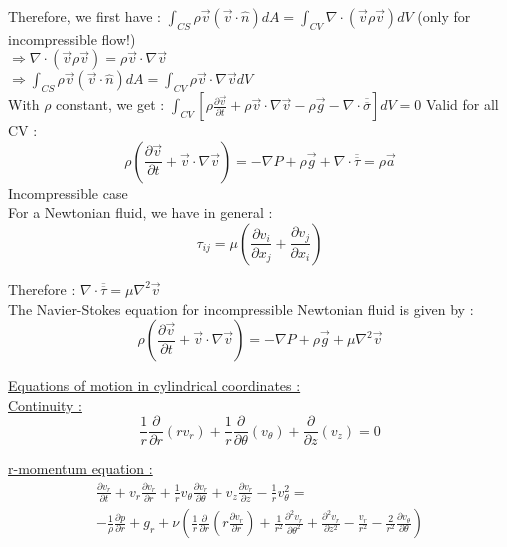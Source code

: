 \documentclass[../main.tex]{subfiles}
\begin{document}
Therefore, we first have : $\int_{CS} \rho \Vec{v}(\Vec{v}\cdot \hat{n})dA = \int_{CV} \nabla\cdot (\Vec{v}\rho \Vec{v})dV$ (only for incompressible flow!)\\
$\Rightarrow \nabla \cdot(\Vec{v}\rho \Vec{v}) = \rho \Vec{v}\cdot \nabla \Vec{v}$\\
$\Rightarrow \int_{CS} \rho \Vec{v} (\Vec{v}\cdot \hat{n})dA = \int_{CV} \rho \Vec{v}\cdot \nabla \Vec{v}dV$\\
With $\rho$ constant, we get : $\int_{CV} [\rho \frac{\partial \Vec{v}}{\partial t} + \rho \Vec{v}\cdot \nabla \Vec{v} - \rho \Vec{g} - \nabla \cdot \overline{\overline{\sigma}}]dV = 0$ Valid for all CV :\\
\begin{equation}
    \rho (\frac{\partial \Vec{v}}{\partial t} + \Vec{v} \cdot \nabla \Vec{v}) = -\nabla P + \rho \Vec{g} + \nabla \cdot \overline{\overline{\tau}} = \rho \Vec{a}
\end{equation}
Incompressible case\\


For a Newtonian fluid, we have in general : \begin{equation}
    \tau_{ij} = \mu (\frac{\partial v_i}{\partial x_j} + \frac{\partial v_j}{\partial x_i})
\end{equation}

Therefore : $\nabla \cdot \overline{\overline{\tau}} = \mu \nabla^2 \Vec{v}$\\

The Navier-Stokes equation for incompressible Newtonian fluid is given by :\\
\begin{equation}
    \rho (\frac{\partial \Vec{v}}{\partial t} + \Vec{v} \cdot \nabla \Vec{v}) = -\nabla P + \rho \Vec{g} + \mu \nabla^2 \Vec{v}
\end{equation}

\quad \underline{Equations of motion in cylindrical coordinates :}\\

\underline{Continuity :} \begin{equation}
    \frac{1}{r} \frac{\partial}{\partial r}(rv_r) + \frac{1}{r} \frac{\partial}{\partial \theta} (v_\theta) + \frac{\partial}{\partial z}(v_z)=0
\end{equation}

\underline{r-momentum equation :} \begin{equation}
    \begin{gathered}
        \frac{\partial v_r}{\partial t} + v_r \frac{\partial v_r}{\partial r} + \frac{1}{r} v_\theta \frac{\partial v_r}{\partial \theta} + v_z \frac{\partial v_r}{\partial z} - \frac{1}{r}v_\theta^2 = \\
        -\frac{1}{\rho} \frac{\partial p}{\partial r} + g_r + \nu(\frac{1}{r} \frac{\partial}{\partial r}(r \frac{\partial v_r}{\partial r}) + \frac{1}{r^2} \frac{\partial^2 v_r}{\partial \theta^2} + \frac{\partial^2 v_r}{\partial z^2} - \frac{v_r}{r^2} - \frac{2}{r^2}\frac{\partial v_\theta}{\partial \theta})
    \end{gathered}
\end{equation}
\end{document}
